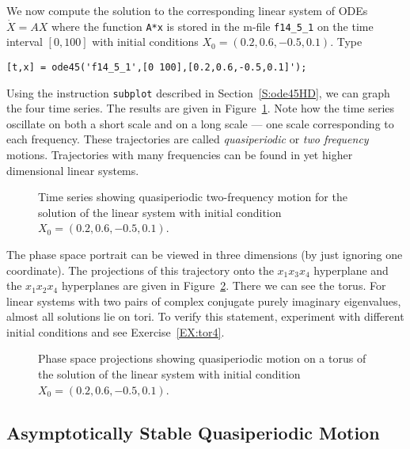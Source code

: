 \documentclass{ximera}
\begin{document}
We now compute the solution to the corresponding linear system of ODEs 
$\dot{X}=AX$ where the function {\tt A*x} is stored in the m-file 
{\tt f14\_5\_1} on the time interval $[0,100]$ with 
initial conditions $X_0=(0.2,0.6,-0.5,0.1)$. Type
\begin{verbatim}
[t,x] = ode45('f14_5_1',[0 100],[0.2,0.6,-0.5,0.1]');
\end{verbatim}
Using the \Matlab instruction {\tt subplot} described in 
Section~\ref{S:ode45HD}, we can graph the four time series.
The results are given in 
Figure~\ref{F:ftor4ts}.  Note how the time series oscillate on both a short 
scale and on a long scale --- one scale corresponding to each frequency.  
These trajectories are called {\em quasiperiodic\/}
 or {\em two frequency\/} motions.
  Trajectories with many frequencies can be 
found in yet higher dimensional linear systems.


\begin{figure}[htb]
   \centerline{%
   }
   \caption{Time series showing quasiperiodic two-frequency motion for the 
	solution of the linear system \protect{} with initial 
	condition $X_0=(0.2,0.6,-0.5,0.1)$.}
   \label{F:ftor4ts}
\end{figure}

The phase space portrait can be viewed in three dimensions (by just 
ignoring one coordinate).  The projections of this trajectory onto the 
$x_1x_3x_4$ hyperplane and the $x_1x_2x_4$ hyperplanes are given in 
Figure~\ref{F:ftorphase}.  There we can see the torus.  For 
linear systems with two pairs of complex conjugate purely imaginary
eigenvalues, almost all solutions lie on tori.  To verify this statement, 
experiment with different initial conditions and see Exercise~\ref{EX:tor4}. 

\begin{figure}[htb]
   \centerline{%
   }
   \caption{Phase space projections showing quasiperiodic motion on a torus of 
	the solution of the linear system \protect{} with initial 
	condition $X_0=(0.2,0.6,-0.5,0.1)$.}
   \label{F:ftorphase}
\end{figure}

\subsection*{Asymptotically Stable Quasiperiodic Motion}
\end{document}
